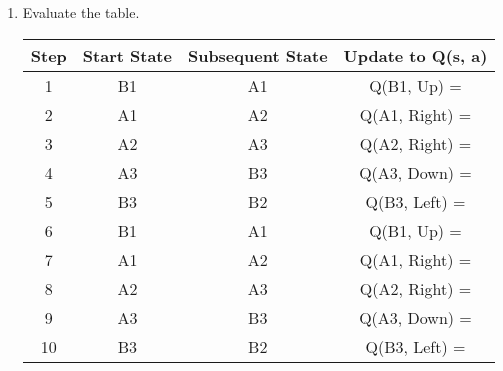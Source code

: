 \documentclass[12pt,letterpaper]{article}
\begin{document}
\begin{enumerate}
    \item
      Evaluate the table.
      \begin{tabular}{| c | c | c | c |}
      \hline
      Step & Start State & Subsequent State & Update to Q(s, a) \\
      \hline
      1  & B1 & A1 & Q(B1, Up) = \\
      \hline
      2  & A1 & A2 & Q(A1, Right) = \\
      \hline
      3  & A2 & A3 & Q(A2, Right) = \\
      \hline
      4  & A3 & B3 & Q(A3, Down) = \\
      \hline
      5  & B3 & B2 & Q(B3, Left) = \\
      \hline
      6  & B1 & A1 & Q(B1, Up) = \\
      \hline
      7  & A1 & A2 & Q(A1, Right) = \\
      \hline
      8  & A2 & A3 & Q(A2, Right) = \\
      \hline
      9  & A3 & B3 & Q(A3, Down) = \\
      \hline
      10 & B3 & B2 & Q(B3, Left) = \\
      \hline
      \end{tabular}
  \end{enumerate}
\end{document}
